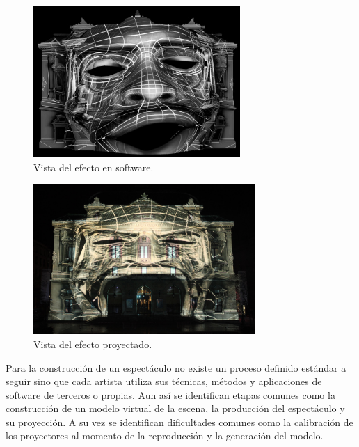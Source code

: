 \begin{minipage}{0.50\textwidth}
\begin{flushleft} \large
\begin{figure}[H]
  \centering
    \includegraphics[width=0.7\textwidth]{./Cap1_intro/celestin_head.jpg}
  \caption[http://mappingvideo.blogspot.com/]{Vista del efecto en software.}
  \label{fig:Efecto1}
\end{figure}
\end{flushleft}
\end{minipage}
\begin{minipage}{0.50\textwidth}
\begin{flushright} \large
\begin{figure}[H]
  \centering
    \includegraphics[width=0.75\textwidth]{./Cap1_intro/realcelestins_headshot.jpg}
  \caption[http://mappingvideo.blogspot.com/]{Vista del efecto proyectado.}
  \label{fig:Efecto2}
\end{figure}
\end{flushright}
\end{minipage}

Para la construcción de un espectáculo no existe un proceso definido estándar a seguir sino que cada artista utiliza sus técnicas, métodos y aplicaciones de software de terceros o propias. Aun así se identifican etapas comunes como la construcción de un modelo virtual de la escena, la producción del espectáculo y su proyección. A su vez se identifican dificultades comunes como la calibración de los proyectores al momento de la reproducción y la generación del modelo.

